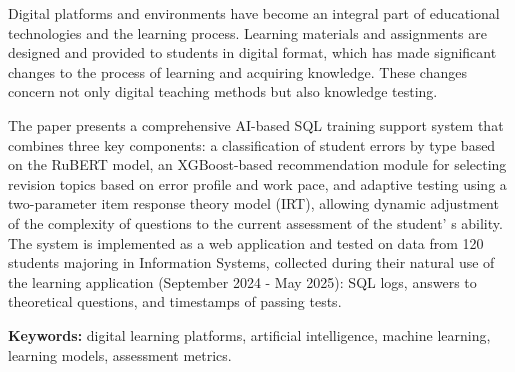 Digital platforms and environments have become an integral part of
educational technologies and the learning process. Learning materials
and assignments are designed and provided to students in digital format,
which has made significant changes to the process of learning and
acquiring knowledge. These changes concern not only digital teaching
methods but also knowledge testing.

The paper presents a comprehensive AI-based SQL training support system
that combines three key components: a classification of student errors
by type based on the RuBERT model, an XGBoost-based recommendation
module for selecting revision topics based on error profile and work
pace, and adaptive testing using a two-parameter item response theory
model (IRT), allowing dynamic adjustment of the complexity of questions
to the current assessment of the student' s ability. The
system is implemented as a web application and tested on data from 120
students majoring in Information Systems, collected during their natural
use of the learning application (September 2024 - May 2025): SQL logs,
answers to theoretical questions, and timestamps of passing tests.

{\bfseries Keywords:} digital learning platforms, artificial intelligence,
machine learning, learning models, assess\-ment metrics.

